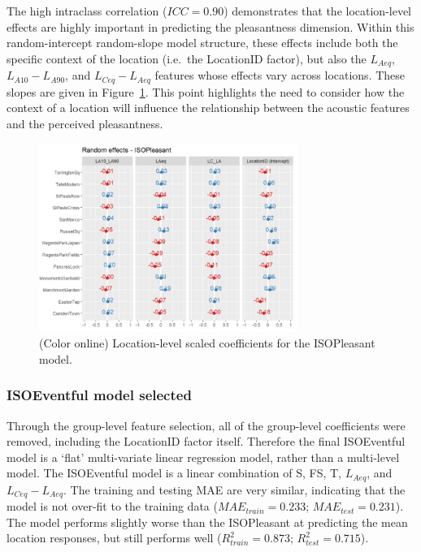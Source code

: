 \documentclass[
  authoryear,
  preprint,
  3p,
  onecolumn]{elsarticle}
\begin{document}
The high intraclass correlation (\(ICC = 0.90\)) demonstrates that the
location-level effects are highly important in predicting the
pleasantness dimension. Within this random-intercept random-slope model
structure, these effects include both the specific context of the
location (i.e.~the LocationID factor), but also the \(L_{Aeq}\),
\(L_{A10}-L_{A90}\), and \(L_{Ceq}-L_{Aeq}\) features whose effects vary
across locations. These slopes are given in Figure~\ref{fig-random}.
This point highlights the need to consider how the context of a location
will influence the relationship between the acoustic features and the
perceived pleasantness.

\begin{figure}

{\centering \includegraphics[width=0.75\textwidth,height=\textheight]{Figure4.jpg}

}

\caption{\label{fig-random}(Color online) Location-level scaled
coefficients for the ISOPleasant model.}

\end{figure}

\hypertarget{isoeventful-model-selected}{%
\subsubsection{ISOEventful model
selected}\label{isoeventful-model-selected}}

Through the group-level feature selection, all of the group-level
coefficients were removed, including the LocationID factor itself.
Therefore the final ISOEventful model is a `flat' multi-variate linear
regression model, rather than a multi-level model. The ISOEventful model
is a linear combination of S, FS, T, \(L_{Aeq}\), and
\(L_{Ceq}-L_{Aeq}\). The training and testing MAE are very similar,
indicating that the model is not over-fit to the training data
(\(MAE_{train} = 0.233\); \(MAE_{test} = 0.231\)). The model performs
slightly worse than the ISOPleasant at predicting the mean location
responses, but still performs well (\(R^2_{train} = 0.873\);
\(R^2_{test} = 0.715\)).
\end{document}
